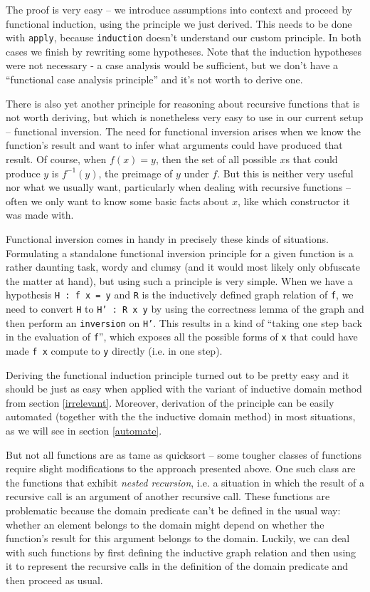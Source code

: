\documentclass[declaration,mgr,english,shortabstract]{iithesis}
\newcommand{\m}[1]{\texttt{#1}}
\begin{document}
The proof is very easy -- we introduce assumptions into context and proceed by functional induction, using the principle we just derived. This needs to be done with \m{apply}, because \m{induction} doesn't understand our custom principle. In both cases we finish by rewriting some hypotheses. Note that the induction hypotheses were not necessary - a case analysis would be sufficient, but we don't have a ``functional case analysis principle'' and it's not worth to derive one.

There is also yet another principle for reasoning about recursive functions that is not worth deriving, but which is nonetheless very easy to use in our current setup -- functional inversion. The need for functional inversion arises when we know the function's result and want to infer what arguments could have produced that result. Of course, when $f(x) = y$, then the set of all possible $x$s that could produce $y$ is $f^{-1}(y)$, the preimage of $y$ under $f$. But this is neither very useful nor what we usually want, particularly when dealing with recursive functions -- often we only want to know some basic facts about $x$, like which constructor it was made with.

Functional inversion comes in handy in precisely these kinds of situations. Formulating a standalone functional inversion principle for a given function is a rather daunting task, wordy and clumsy (and it would most likely only obfuscate the matter at hand), but using such a principle is very simple. When we have a hypothesis \m{H : f x = y} and \m{R} is the inductively defined graph relation of \m{f}, we need to convert \m{H} to \m{H' : R x y} by using the correctness lemma of the graph and then perform an \m{inversion} on \m{H'}. This results in a kind of ``taking one step back in the evaluation of \m{f}'', which exposes all the possible forms of \m{x} that could have made \m{f x} compute to \m{y} directly (i.e. in one step).

Deriving the functional induction principle turned out to be pretty easy and it should be just as easy when applied with the variant of inductive domain method from section \ref{irrelevant}. Moreover, derivation of the principle can be easily automated (together with the the inductive domain method) in most situations, as we will see in section \ref{automate}.

But not all functions are as tame as quicksort -- some tougher classes of functions require slight modifications to the approach presented above. One such class are the functions that exhibit \textit{nested recursion}, i.e. a situation in which the result of a recursive call is an argument of another recursive call. These functions are problematic because the domain predicate can't be defined in the usual way: whether an element belongs to the domain might depend on whether the function's result for this argument belongs to the domain. Luckily, we can deal with such functions by first defining the inductive graph relation and then using it to represent the recursive calls in the definition of the domain predicate and then proceed as usual.
\end{document}
